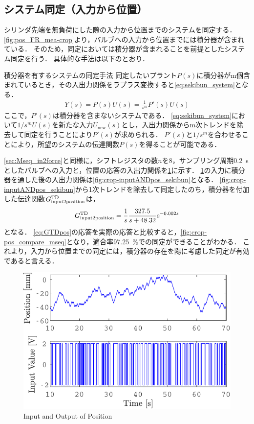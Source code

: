 \subsection{システム同定（入力から位置）}
シリンダ先端を無負荷にした際の入力から位置までのシステムを同定する．
\figname\ref{fig:pos_FR_mea-crop}より，バルブへの入力から位置までには積分器が含まれている．
そのため，同定においては積分器が含まれることを前提としたシステム同定\cite{竹下侑2014積分器を有するシステムの同定について}を行う．
具体的な手法は以下のとおり．
\begin{itembox}[l]{積分器を有するシステムの同定手法}
    同定したいプラント$P(s)$に積分器がm個含まれているとき，その入出力関係をラプラス変換すると\eqnname\eqref{eq:sekibun_system}となる．
    \begin{align}
        \label{eq:sekibun_system}
        Y(s) = P(s)U(s) = \frac{1}{s^m}P'(s)U(s)
    \end{align}
    ここで，$P'(s)$は積分器を含まないシステムである．
    \eqnname\eqref{eq:sekibun_system}において${1}/{s^m}U(s)$を新たな入力$U_{\mathrm{new}}(s)$とし，入出力関係からm次トレンドを除去して同定を行うことにより$P'(s)$が求められる．
    $P'(s)$と$1/s^m$を合わせることにより，所望のシステムの伝達関数$P(s)$を得ることが可能である．
\end{itembox}
\ref{sec:Mseq_in2force}と同様に，シフトレジスタの数$n$を8，サンプリング周期\SI{0.2}{s}としたバルブへの入力と，位置の応答の入出力関係を\figname\ref{fig:crop-inputANDpos}に示す．
\figname\ref{fig:crop-inputANDpos}の入力に積分器を通した後の入出力関係は\figname\ref{fig:crop-inputANDpos_sekibun}となる．
\figname\ref{fig:crop-inputANDpos_sekibun}から1次トレンドを除去して同定したのち，積分器を付加した伝達関数$G_{\mathrm{input}2\mathrm{position}}^{\mathrm{TD}}$は，
\begin{align}
    \label{eq:GTDpos}
    G_{\mathrm{input}2\mathrm{position}}^{\mathrm{TD}} = \frac{1}{s}\frac{327.5}{s+48.32}\mathrm{e}^{-0.002s}
\end{align}
となる．
\eqnname\eqref{eq:GTDpos}の応答を実際の応答と比較すると，\figname\ref{fig:crop-pos_compare_mseq}となり，適合率\SI{97.25}{\%}での同定ができることがわかる．
これより，入力から位置までの同定には，積分器の存在を陽に考慮した同定が有効であると言える．
\begin{figure}[t]
    \centering
        \includegraphics[keepaspectratio, scale=1.0]{contents/SystemIdentification/figure/crop-inputANDpos.pdf}
        \caption{Input and Output of Position}
        \label{fig:crop-inputANDpos}
\end{figure}
